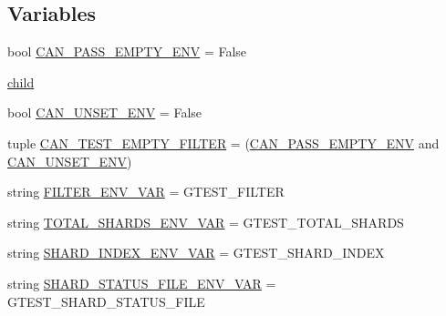 \subsection*{Variables}
\begin{DoxyCompactItemize}
\item 
bool \mbox{\hyperlink{namespacegoogletest-master_1_1googletest_1_1test_1_1googletest-filter-unittest_abf0e52633b951fb0b43defe49b46041c}{C\+A\+N\+\_\+\+P\+A\+S\+S\+\_\+\+E\+M\+P\+T\+Y\+\_\+\+E\+NV}} = False
\item 
\mbox{\hyperlink{namespacegoogletest-master_1_1googletest_1_1test_1_1googletest-filter-unittest_afbf6a74078649437f6f0bc9b0298d31c}{child}}
\item 
bool \mbox{\hyperlink{namespacegoogletest-master_1_1googletest_1_1test_1_1googletest-filter-unittest_a0116fa2cffd11bf342cf119cb9689e6c}{C\+A\+N\+\_\+\+U\+N\+S\+E\+T\+\_\+\+E\+NV}} = False
\item 
tuple \mbox{\hyperlink{namespacegoogletest-master_1_1googletest_1_1test_1_1googletest-filter-unittest_aebad30d6b70749cac0845299384ff4c7}{C\+A\+N\+\_\+\+T\+E\+S\+T\+\_\+\+E\+M\+P\+T\+Y\+\_\+\+F\+I\+L\+T\+ER}} = (\mbox{\hyperlink{namespacegoogletest-master_1_1googletest_1_1test_1_1googletest-filter-unittest_abf0e52633b951fb0b43defe49b46041c}{C\+A\+N\+\_\+\+P\+A\+S\+S\+\_\+\+E\+M\+P\+T\+Y\+\_\+\+E\+NV}} and \mbox{\hyperlink{namespacegoogletest-master_1_1googletest_1_1test_1_1googletest-filter-unittest_a0116fa2cffd11bf342cf119cb9689e6c}{C\+A\+N\+\_\+\+U\+N\+S\+E\+T\+\_\+\+E\+NV}})
\item 
string \mbox{\hyperlink{namespacegoogletest-master_1_1googletest_1_1test_1_1googletest-filter-unittest_a75616f35372c063dce6e648c52ccad6f}{F\+I\+L\+T\+E\+R\+\_\+\+E\+N\+V\+\_\+\+V\+AR}} = \textquotesingle{}G\+T\+E\+S\+T\+\_\+\+F\+I\+L\+T\+ER\textquotesingle{}
\item 
string \mbox{\hyperlink{namespacegoogletest-master_1_1googletest_1_1test_1_1googletest-filter-unittest_a987bf0f4ff61bc780d8c7f206dac52ff}{T\+O\+T\+A\+L\+\_\+\+S\+H\+A\+R\+D\+S\+\_\+\+E\+N\+V\+\_\+\+V\+AR}} = \textquotesingle{}G\+T\+E\+S\+T\+\_\+\+T\+O\+T\+A\+L\+\_\+\+S\+H\+A\+R\+DS\textquotesingle{}
\item 
string \mbox{\hyperlink{namespacegoogletest-master_1_1googletest_1_1test_1_1googletest-filter-unittest_a684e9e3aa56786e4901975c6e6283f86}{S\+H\+A\+R\+D\+\_\+\+I\+N\+D\+E\+X\+\_\+\+E\+N\+V\+\_\+\+V\+AR}} = \textquotesingle{}G\+T\+E\+S\+T\+\_\+\+S\+H\+A\+R\+D\+\_\+\+I\+N\+D\+EX\textquotesingle{}
\item 
string \mbox{\hyperlink{namespacegoogletest-master_1_1googletest_1_1test_1_1googletest-filter-unittest_a499e08a5a8cfbacc9c47c53f45a4ad51}{S\+H\+A\+R\+D\+\_\+\+S\+T\+A\+T\+U\+S\+\_\+\+F\+I\+L\+E\+\_\+\+E\+N\+V\+\_\+\+V\+AR}} = \textquotesingle{}G\+T\+E\+S\+T\+\_\+\+S\+H\+A\+R\+D\+\_\+\+S\+T\+A\+T\+U\+S\+\_\+\+F\+I\+LE\textquotesingle{}

\end{DoxyCompactItemize}
